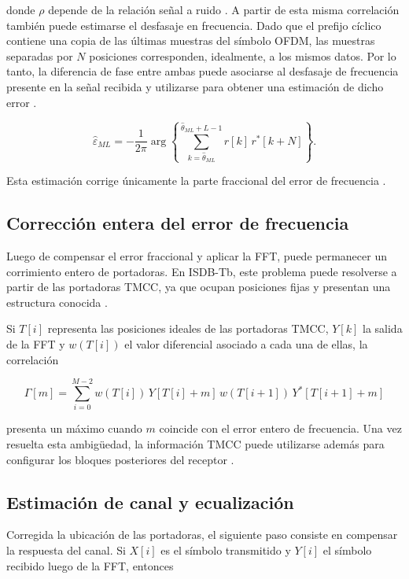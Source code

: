 donde $\rho$ depende de la relación señal a ruido \cite{uruguay_rx}. A partir de esta misma correlación también puede estimarse el desfasaje en frecuencia. Dado que el prefijo cíclico contiene una copia de las últimas muestras del símbolo OFDM, las muestras separadas por \(N\) posiciones corresponden, idealmente, a los mismos datos. Por lo tanto, la diferencia de fase entre ambas puede asociarse al desfasaje de frecuencia presente en la señal recibida y utilizarse para obtener una estimación de dicho error \cite{uruguay_rx}.

\begin{equation}
\hat{\varepsilon}_{ML}
=
-\frac{1}{2\pi}
\arg
\left\{
\sum_{k=\hat{\theta}_{ML}}^{\hat{\theta}_{ML}+L-1}
r[k]\,r^{*}[k+N]
\right\}.
\end{equation}

Esta estimación corrige únicamente la parte fraccional del error de frecuencia \cite{uruguay_rx}.

\subsection{Corrección entera del error de frecuencia}

Luego de compensar el error fraccional y aplicar la FFT, puede permanecer un corrimiento entero de portadoras. En ISDB-Tb, este problema puede resolverse a partir de las portadoras TMCC, ya que ocupan posiciones fijas y presentan una estructura conocida \cite{uruguay_rx}.

Si $T[i]$ representa las posiciones ideales de las portadoras TMCC, $Y[k]$ la salida de la FFT y $w(T[i])$ el valor diferencial asociado a cada una de ellas, la correlación

\begin{equation}
\Gamma[m]
=
\sum_{i=0}^{M-2}
w(T[i])\,Y[T[i]+m]\,
w(T[i+1])\,Y^{*}[T[i+1]+m]
\end{equation}

presenta un máximo cuando $m$ coincide con el error entero de frecuencia. Una vez resuelta esta ambigüedad, la información TMCC puede utilizarse además para configurar los bloques posteriores del receptor \cite{uruguay_rx}.

\subsection{Estimación de canal y ecualización}

Corregida la ubicación de las portadoras, el siguiente paso consiste en compensar la respuesta del canal. Si $X[i]$ es el símbolo transmitido y $Y[i]$ el símbolo recibido luego de la FFT, entonces

